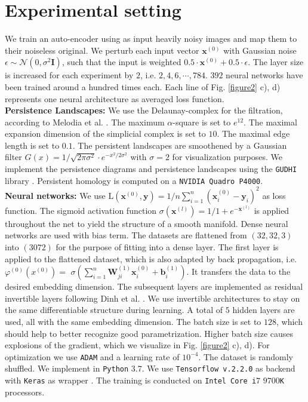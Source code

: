 \documentclass[runningheads,orivec]{llncs}
\begin{document}
\section{Experimental setting}

We train an auto-encoder using as input heavily noisy images and map them to their noiseless original. We perturb each input vector $\textbf{x}^{(0)}$ with Gaussian noise $\epsilon \sim \mathcal{N}(0,\sigma^2 \mathbf{I})$, such that the input is weighted $0.5 \cdot \textbf{x}^{(0)} + 0.5 \cdot \epsilon$. The layer size is increased for each experiment by $2$, i.e. $2,4,6, \cdots, 784$. $392$ neural networks have been trained around a hundred times each. Each line of Fig. \ref{figure2} c), d) represents one neural architecture as averaged loss function.\\[0.4cm]
\textbf{Persistence Landscapes:} We use the Delaunay-complex for the filtration, according to Melodia et al. \cite{lume}. The maximum $\alpha$-square is set to $e^{12}$. The maximal expansion dimension of the simplicial complex is set to $10$. The maximal edge length is set to $0.1$. The persistent landscapes are smoothened by a Gaussian filter $G(x) = 1 / \sqrt{2 \pi \sigma^2} \cdot e^{- x^2 / 2 \sigma^2}$ with $\sigma = 2$ for visualization purposes. We implement the persistence diagrams and persistence landscapes using the \texttt{GUDHI} library \cite{gudhi:urm}. Persistent homology is computed on a \texttt{NVIDIA Quadro P4000}.\\[0.4cm]
\textbf{Neural networks:} We use $\text{L}(\textbf{x}^{(0)}, \textbf{y}) = 1/n \sum_{i=1}^{n} (\textbf{x}^{(0)}_i-\textbf{y}_i)^2$ as loss function. The sigmoid activation function $\sigma(\mathbf{x}^{(l)}) = 1 / 1 + e^{-\mathbf{x}^{(l)}}$ is applied throughout the net to yield the structure of a smooth manifold. Dense neural networks are used with bias term. The datasets are flattened from $(32,32,3)$ into $(3072)$ for the purpose of fitting into a dense layer. The first layer is applied to the flattened dataset, which is also adapted by back propagation, i.e. $\varphi^{(0)}(x^{(0)}) =$ $\sigma(\sum_{i=1}^{n} \textbf{W}_{ji}^{(1)} \textbf{x}_{i}^{(0)} + \textbf{b}_{i}^{(1)})$. It transfers the data to the desired embedding dimension. The subsequent layers are implemented as residual invertible layers following Dinh et al. \cite{DinhSB17}. We use invertible architectures to stay on the same differentiable structure during learning. A total of $5$ hidden layers are used, all with the same embedding dimension. The batch size is set to $128$, which should help to better recognize good parametrization. Higher batch size causes explosions of the gradient, which we visualize in Fig. \ref{figure2} c), d). For optimization we use \texttt{ADAM} \cite{KingmaB14} and a learning rate of $10^{-4}$. The dataset is randomly shuffled. We implement in \texttt{Python} $3.7$. We use \texttt{Tensorflow v.2.2.0} as backend \cite{tensorflow2015-whitepaper} with \texttt{Keras} as wrapper \cite{chollet2015keras}. The training is conducted on \texttt{Intel Core i}$7$ $9700$\texttt{K} processors.\\[0.4cm]
\end{document}
